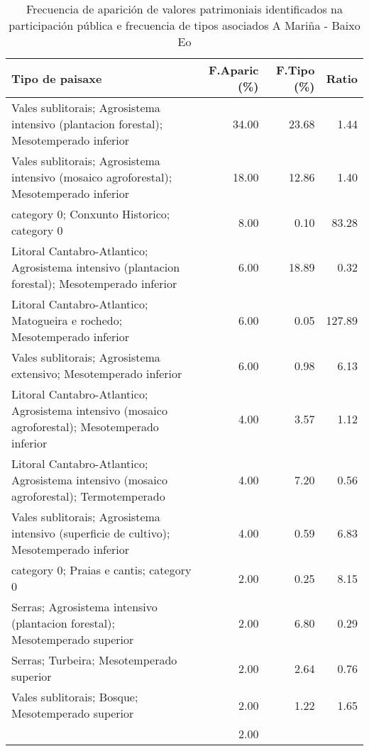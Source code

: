 \begin{table}[p]
\centering
\caption{Frecuencia de aparición de valores patrimoniais identificados na participación pública e frecuencia de tipos asociados A Mariña - Baixo Eo} 
\label{vsixotpat2}
\begin{tabular}{lrrr}
  \hline
Tipo de paisaxe & F.Aparic (\%) & F.Tipo (\%) & Ratio \\ 
  \hline
Vales sublitorais; Agrosistema intensivo (plantacion forestal); Mesotemperado inferior & 34.00 & 23.68 & 1.44 \\ 
  Vales sublitorais; Agrosistema intensivo (mosaico agroforestal); Mesotemperado inferior & 18.00 & 12.86 & 1.40 \\ 
  category 0; Conxunto Historico; category 0 & 8.00 & 0.10 & 83.28 \\ 
  Litoral Cantabro-Atlantico; Agrosistema intensivo (plantacion forestal); Mesotemperado inferior & 6.00 & 18.89 & 0.32 \\ 
  Litoral Cantabro-Atlantico; Matogueira e rochedo; Mesotemperado inferior & 6.00 & 0.05 & 127.89 \\ 
  Vales sublitorais; Agrosistema extensivo; Mesotemperado inferior & 6.00 & 0.98 & 6.13 \\ 
  Litoral Cantabro-Atlantico; Agrosistema intensivo (mosaico agroforestal); Mesotemperado inferior & 4.00 & 3.57 & 1.12 \\ 
  Litoral Cantabro-Atlantico; Agrosistema intensivo (mosaico agroforestal); Termotemperado & 4.00 & 7.20 & 0.56 \\ 
  Vales sublitorais; Agrosistema intensivo (superficie de cultivo); Mesotemperado inferior & 4.00 & 0.59 & 6.83 \\ 
  category 0; Praias e cantis; category 0 & 2.00 & 0.25 & 8.15 \\ 
  Serras; Agrosistema intensivo (plantacion forestal); Mesotemperado superior & 2.00 & 6.80 & 0.29 \\ 
  Serras; Turbeira; Mesotemperado superior & 2.00 & 2.64 & 0.76 \\ 
  Vales sublitorais; Bosque; Mesotemperado superior & 2.00 & 1.22 & 1.65 \\ 
   & 2.00 &  &  \\ 
   \hline
\end{tabular}
\end{table}
